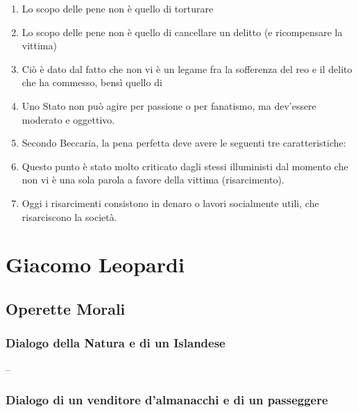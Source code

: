\documentclass{article}
\begin{document}
\begin{enumerate}
    \item Lo scopo delle pene non è quello di torturare
    \item Lo scopo delle pene non è quello di cancellare un delitto (e ricompensare la vittima)
    \item Ciò è dato dal fatto che non vi è un legame fra la sofferenza del reo e il delito che ha commesso,
    bensì quello di 
    \item Uno Stato non può agire per passione o per fanatismo, ma dev’essere moderato e oggettivo.
    \item Secondo Beccaria, la pena perfetta deve avere le seguenti tre caratteristiche:
    \item Questo punto è stato molto criticato dagli stessi illuministi dal momento che non vi è una sola parola a
    favore della vittima (risarcimento).
    \item Oggi i risarcimenti consistono in denaro o lavori socialmente utili, che
    risarciscono la società.
\end{enumerate}

\newpage
\section{Giacomo Leopardi}
\subsection{Operette Morali}
\subsubsection{Dialogo della Natura e di un Islandese}

--

\newpage
\subsubsection{Dialogo di un venditore d'almanacchi e di un passeggere}
\end{document}

